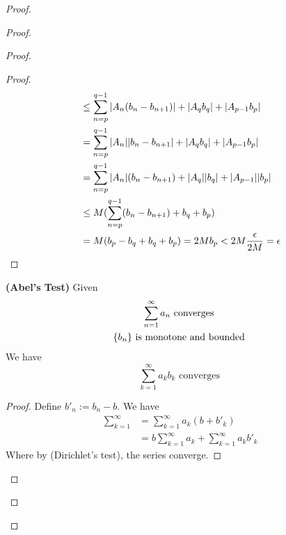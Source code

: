 \documentclass{report}
\begin{document}
\begin{proof}
\begin{proof}
\begin{proof}
\begin{proof}
\begin{align}
&\leq \sum_{n=p}^{q-1}|A_n(b_n-b_{n+1})|+|A_qb_q|+|A_{p-1}b_p|\\
&=\sum_{n=p}^{q-1} |A_n||b_n-b_{n+1}|+|A_qb_q|+|A_{p-1}b_p|\\
&=\sum_{n=p}^{q-1}|A_n|(b_n-b_{n+1})+|A_q||b_q|+|A_{p-1}||b_p|\\
&\leq M(\sum_{n=p}^{q-1}(b_n-b_{n+1})+b_q+b_p)\\
&=M(b_p-b_q+b_q+b_p)=2Mb_p<2M \frac{\epsilon }{2M}=\epsilon 
\end{align}
\end{proof}
\begin{theorem}
\label{4.6.6}
\textbf{(Abel's Test)}
Given 
\begin{gather}
\sum_{n=1}^\infty a_n\text{ converges }\\
\{ b_n \}\text{ is monotone and bounded }
\end{gather}
We have
\begin{equation}
\sum_{k=1}^\infty a_kb_k\text{ converges }
\end{equation}
\end{theorem}
\begin{proof}
Define $b'_n:=b_n-b$. We have
 \begin{align}
\sum_{k=1}^\infty &=\sum_{k=1}^\infty a_k(b+b'_k)\\
&=b\sum_{k=1}^\infty a_k+\sum_{k=1}^\infty a_kb'_k
\end{align}
Where by   (Dirichlet's test), the series converge.
\end{proof}

\end{proof}
\end{proof}
\end{proof}
\end{document}

